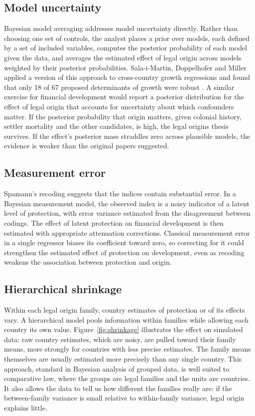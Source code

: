 \subsection{Model uncertainty}

Bayesian model averaging addresses model uncertainty directly. Rather than choosing one set of controls, the analyst places a prior over models, each defined by a set of included variables, computes the posterior probability of each model given the data, and averages the estimated effect of legal origin across models weighted by their posterior probabilities. Sala-i-Martin, Doppelhofer and Miller applied a version of this approach to cross-country growth regressions and found that only 18 of 67 proposed determinants of growth were robust \citep{sala2004}. A similar exercise for financial development would report a posterior distribution for the effect of legal origin that accounts for uncertainty about which confounders matter. If the posterior probability that origin matters, given colonial history, settler mortality and the other candidates, is high, the legal origins thesis survives. If the effect's posterior mass straddles zero across plausible models, the evidence is weaker than the original papers suggested.

\subsection{Measurement error}

Spamann's recoding suggests that the indices contain substantial error. In a Bayesian measurement model, the observed index is a noisy indicator of a latent level of protection, with error variance estimated from the disagreement between codings. The effect of latent protection on financial development is then estimated with appropriate attenuation corrections. Classical measurement error in a single regressor biases its coefficient toward zero, so correcting for it could strengthen the estimated effect of protection on development, even as recoding weakens the association between protection and origin.

\subsection{Hierarchical shrinkage}

Within each legal origin family, country estimates of protection or of its effects vary. A hierarchical model pools information within families while allowing each country its own value. Figure~\ref{fig:shrinkage} illustrates the effect on simulated data: raw country estimates, which are noisy, are pulled toward their family means, more strongly for countries with less precise estimates. The family means themselves are usually estimated more precisely than any single country. This approach, standard in Bayesian analysis of grouped data, is well suited to comparative law, where the groups are legal families and the units are countries. It also allows the data to tell us how different the families really are: if the between-family variance is small relative to within-family variance, legal origin explains little.

